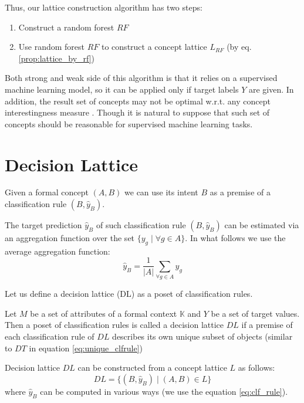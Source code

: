 \documentclass[runningheads]{llncs}
\begin{document}
Thus, our lattice construction algorithm has two steps:
\begin{enumerate}
    \item Construct a random forest $RF$
    \item Use random forest $RF$ to construct a concept lattice $L_{RF}$ (by eq. \ref{prop:lattice_by_rf})
\end{enumerate}

Both strong and weak side of this algorithm is that it relies on a supervised machine learning model, so it can be applied only if target  labels $Y$ are given. In addition, the result set of concepts may not be optimal w.r.t. any concept interestingness measure \cite{km2018}. Though it is natural to suppose that such set of concepts should be reasonable for supervised machine learning tasks.

\section{Decision Lattice}

Given a formal concept $(A, B)$ we can use its intent $B$ as a premise of a classification rule $(B, \hat{y}_B)$.

The target prediction $\hat{y}_B$ of such classification rule $(B, \hat{y}_B)$ can be estimated via an aggregation function over the set $\{y_g \mid \forall g \in A\}$. In what follows we use the average aggregation function:
\begin{equation}
    \hat{y}_B = \frac{1}{|A|} \sum_{\forall g \in A} y_g
    \label{eq:clf_rule}
\end{equation}

Let us define a decision lattice (DL) as a poset of classification rules.

\begin{definition}
Let $M$ be a set of attributes of a formal context $\mathbb{K}$ and $Y$ be a set of target values. Then a poset of classification rules is called a decision lattice $DL$ if a premise of each classification rule of $DL$ describes its own unique subset of objects (similar to $DT$ in equation \ref{eq:unique_clfrule})
\end{definition}

Decision lattice $DL$ can be constructed from a concept lattice $L$ as follows:
\begin{equation}
    DL = \{ (B, \hat{y}_B) \mid (A, B) \in L \}
\end{equation}
where $\hat{y}_B$ can be computed in various ways (we use the equation \ref{eq:clf_rule}).
\end{document}
